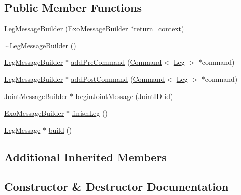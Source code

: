 \subsection*{Public Member Functions}
\begin{DoxyCompactItemize}
\item 
\hyperlink{classLegMessageBuilder_a13c36f02d8d3b0c154401dd48a4e78f1}{Leg\+Message\+Builder} (\hyperlink{classExoMessageBuilder}{Exo\+Message\+Builder} $\ast$return\+\_\+context)
\item 
\hyperlink{classLegMessageBuilder_a10149767436b23b722ad03c5b2ad1ba3}{$\sim$\+Leg\+Message\+Builder} ()
\item 
\hyperlink{classLegMessageBuilder}{Leg\+Message\+Builder} $\ast$ \hyperlink{classLegMessageBuilder_ae211c44deb6af953331fb63d4905c532}{add\+Pre\+Command} (\hyperlink{classCommand}{Command}$<$ \hyperlink{classLeg}{Leg} $>$ $\ast$command)
\item 
\hyperlink{classLegMessageBuilder}{Leg\+Message\+Builder} $\ast$ \hyperlink{classLegMessageBuilder_a3846b2d94304e022f5f213a378e7b7cc}{add\+Post\+Command} (\hyperlink{classCommand}{Command}$<$ \hyperlink{classLeg}{Leg} $>$ $\ast$command)
\item 
\hyperlink{classJointMessageBuilder}{Joint\+Message\+Builder} $\ast$ \hyperlink{classLegMessageBuilder_ab6eb2c55d5479f22e41bb2f4fc298f4d}{begin\+Joint\+Message} (\hyperlink{JointSelect_8hpp_a4afd2607cffce38f5ade02dfdc389cc3}{Joint\+ID} id)
\item 
\hyperlink{classExoMessageBuilder}{Exo\+Message\+Builder} $\ast$ \hyperlink{classLegMessageBuilder_a38862b9d92f3e1877c3d74f8dcfbf1df}{finish\+Leg} ()
\item 
\hyperlink{classLegMessage}{Leg\+Message} $\ast$ \hyperlink{classLegMessageBuilder_ad4342f20929ef314e7fa7800e09a533a}{build} ()
\end{DoxyCompactItemize}
\subsection*{Additional Inherited Members}


\subsection{Constructor \& Destructor Documentation}
